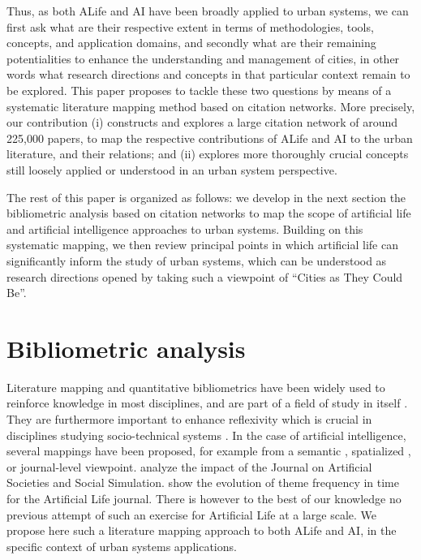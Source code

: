 \documentclass[letterpaper]{article}
\begin{document}
Thus, as both ALife and AI have been broadly applied to urban systems, we can first ask what are their respective extent in terms of methodologies, tools, concepts, and application domains, and secondly what are their remaining potentialities to enhance the understanding and management of cities, in other words what research directions and concepts in that particular context remain to be explored. This paper proposes to tackle these two questions by means of a systematic literature mapping method based on citation networks. More precisely, our contribution (i) constructs and explores a large citation network of around 225,000 papers, to map the respective contributions of ALife and AI to the urban literature, and their relations; and (ii) explores more thoroughly crucial concepts still loosely applied or understood in an urban system perspective.


The rest of this paper is organized as follows: we develop in the next section the bibliometric analysis based on citation networks to map the scope of artificial life and artificial intelligence approaches to urban systems. Building on this systematic mapping, we then review principal points in which artificial life can significantly inform the study of urban systems, which can be understood as research directions opened by taking such a viewpoint of ``Cities as They Could Be''.


\section{Bibliometric analysis}



Literature mapping and quantitative bibliometrics have been widely used to reinforce knowledge in most disciplines, and are part of a field of study in itself \cite{leydesdorff2001challenge}. They are furthermore important to enhance reflexivity which is crucial in disciplines studying socio-technical systems \cite{raimbault2019empowering}. In the case of artificial intelligence, several mappings have been proposed, for example from a semantic \citep{van1993neural}, spatialized \citep{niu2016global}, or journal-level \citep{ibanez2011using} viewpoint. \cite{squazzoni2013social} analyze the impact of the Journal on Artificial Societies and Social Simulation. \cite{aguilar2014past} show the evolution of theme frequency in time for the Artificial Life journal. There is however to the best of our knowledge no previous attempt of such an exercise for Artificial Life at a large scale. We propose here such a literature mapping approach to both ALife and AI, in the specific context of urban systems applications.
\end{document}
